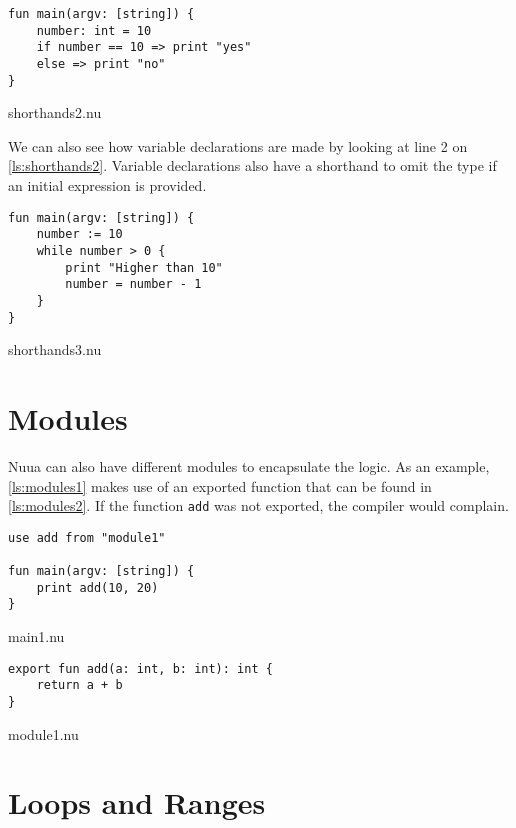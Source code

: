 \begin{code}
\begin{verbatim}
fun main(argv: [string]) {
    number: int = 10
    if number == 10 => print "yes"
    else => print "no"
}
\end{verbatim}
\caption{shorthands2.nu}
\label{ls:shorthands2}
\end{code}

We can also see how variable declarations are made by looking at line 2 on \autoref{ls:shorthands2}.
Variable declarations also have a shorthand to omit the type if an initial expression is provided.\\

\begin{code}
\begin{verbatim}
fun main(argv: [string]) {
    number := 10
    while number > 0 {
        print "Higher than 10"
        number = number - 1
    }
}
\end{verbatim}
\caption{shorthands3.nu}
\label{ls:shorthands3}
\end{code}

\section{Modules}

Nuua can also have different modules to encapsulate the logic. As an example, \autoref{ls:modules1} makes use of an exported function that can be found
in \autoref{ls:modules2}. If the function \texttt{add} was not exported, the compiler would complain.\\

\begin{code}
\begin{verbatim}
use add from "module1"

fun main(argv: [string]) {
    print add(10, 20)
}
\end{verbatim}
\caption{main1.nu}
\label{ls:modules1}
\end{code}

\begin{code}
\begin{verbatim}
export fun add(a: int, b: int): int {
    return a + b
}
\end{verbatim}
\caption{module1.nu}
\label{ls:modules2}
\end{code}

\section{Loops and Ranges}

